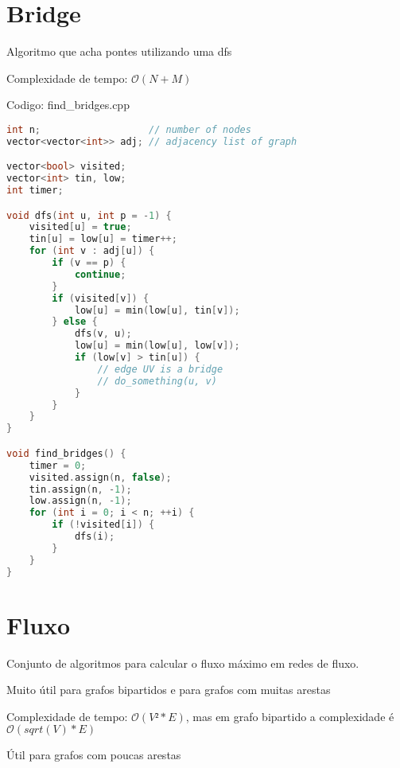 \documentclass[10pt, a4paper, oneside]{book}
\begin{document}
\section{Bridge}


Algoritmo que acha pontes utilizando uma dfs



Complexidade de tempo: $\mathcal{O}(N + M)$

\hfill

Codigo: find\_bridges.cpp

\begin{lstlisting}[language=C++]
int n;                   // number of nodes
vector<vector<int>> adj; // adjacency list of graph

vector<bool> visited;
vector<int> tin, low;
int timer;

void dfs(int u, int p = -1) {
    visited[u] = true;
    tin[u] = low[u] = timer++;
    for (int v : adj[u]) {
        if (v == p) {
            continue;
        }
        if (visited[v]) {
            low[u] = min(low[u], tin[v]);
        } else {
            dfs(v, u);
            low[u] = min(low[u], low[v]);
            if (low[v] > tin[u]) {
                // edge UV is a bridge
                // do_something(u, v)
            }
        }
    }
}

void find_bridges() {
    timer = 0;
    visited.assign(n, false);
    tin.assign(n, -1);
    low.assign(n, -1);
    for (int i = 0; i < n; ++i) {
        if (!visited[i]) {
            dfs(i);
        }
    }
}
\end{lstlisting}
\hfill

\section{Fluxo}


Conjunto de algoritmos para calcular o fluxo máximo em redes de fluxo.



\textbf{} 


Muito útil para grafos bipartidos e para grafos com muitas arestas



Complexidade de tempo: $\mathcal{O}(V² * E)$, mas em grafo bipartido a complexidade é $\mathcal{O}(sqrt(V) * E)$



\textbf{} 


Útil para grafos com poucas arestas
\end{document}
